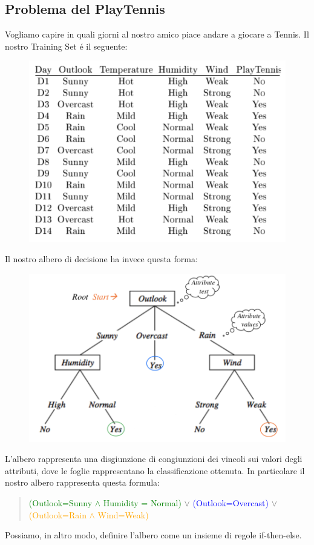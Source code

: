\documentclass{article}
\begin{document}
\subsection{Problema del PlayTennis}
Vogliamo capire in quali giorni al nostro amico piace andare a giocare a Tennis. Il nostro Training Set é il seguente:
\begin{figure}[H]
\centering
\includegraphics[scale=0.5]{Images/playtennistrainingset.png}
\end{figure}
Il nostro albero di decisione ha invece questa forma:
\begin{figure}[H]
\centering
\includegraphics[scale=0.6]{Images/playtennisdecisiontree.png}
\end{figure}
\clearpage
L'albero rappresenta una disgiunzione di congiunzioni dei vincoli sui valori degli attributi, dove le foglie rappresentano la classificazione ottenuta.
In particolare il nostro albero rappresenta questa formula:
\begin{quote}
    \textcolor{green}{(Outlook=Sunny $\land$ Humidity = Normal)} $\lor$ \newline
    \textcolor{blue}{(Outlook=Overcast)} $\lor$ \newline
    \textcolor{orange}{(Outlook=Rain $\land$ Wind=Weak)}
\end{quote}
Possiamo, in altro modo, definire l'albero come un insieme di regole if-then-else.
\end{document}
